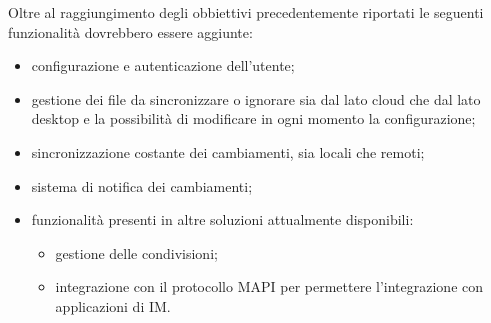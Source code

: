 Oltre al raggiungimento degli obbiettivi precedentemente riportati le seguenti funzionalità dovrebbero essere aggiunte:
\begin{itemize}
\item configurazione e autenticazione dell'utente;
\item gestione dei file da sincronizzare o ignorare sia dal lato cloud che dal lato desktop e la possibilità di modificare in ogni momento la configurazione;
\item sincronizzazione costante dei cambiamenti, sia locali che remoti;
\item sistema di notifica dei cambiamenti;
\item funzionalità presenti in altre soluzioni attualmente disponibili:
    \begin{itemize}
    \item gestione delle condivisioni;
    \item integrazione con il protocollo MAPI per permettere l'integrazione con applicazioni di IM.
    \end{itemize}
\end{itemize}

